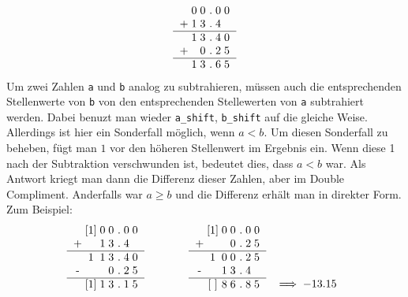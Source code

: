 \documentclass[course=erap]{aspdoc}
\begin{document}
\begin{equation}
\begin{tabular}{c@{\;}c@{\;}c@{\;}c@{\;}c}
  & 0 & 0 . & 0 & 0 \\
+ & 1 & 3 . & 4  \\
\hline
  & 1 & 3 . & 4 & 0 \\
+ &   & 0 . & 2 & 5 \\
\hline
  & 1 & 3 . & 6 & 5 \\
\end{tabular}
\end{equation}
Um zwei Zahlen \texttt{a} und \texttt{b} analog zu subtrahieren, müssen auch die entsprechenden Stellenwerte von \texttt{b} von den entsprechenden Stellewerten von \texttt{a} subtrahiert werden. Dabei benuzt man wieder \texttt{a\_shift}, \texttt{b\_shift} auf die gleiche Weise. Allerdings ist hier ein Sonderfall möglich, wenn $a < b$. Um diesen Sonderfall zu beheben, fügt man $1$ vor den höheren Stellenwert im Ergebnis ein. Wenn diese 1 nach der Subtraktion verschwunden ist, bedeutet dies, dass $a < b$ war. Als Antwort kriegt man dann die Differenz dieser Zahlen, aber im Double Compliment. Anderfalls war $a \geq b$ und die Differenz erhält man in direkter Form. Zum Beispiel:
\begin{equation}
\begin{tabular}{c@{\;}c@{\;}c@{\;}c@{\;}c@{\;}c}
  & [1] & 0 & 0 . & 0 & 0 \\
+ & & 1 & 3 . & 4  \\
\hline
  & 1 & 1 & 3 . & 4 & 0 \\
- & & & 0 . & 2 & 5 \\
\hline
  & [1] & 1 & 3 . & 1 & 5 \\ 
\end{tabular}
\\ \quad \quad \quad \quad
\begin{tabular}{c@{\;}c@{\;}c@{\;}c@{\;}c@{\;}c}
  & [1] & 0 & 0 . & 0 & 0 \\
+ & & & 0 . & 2 & 5 \\
\hline
  & 1 & 0 & 0 . & 2 & 5 \\
- & & 1 & 3 . & 4  \\
\hline
  & [ ] & 8 & 6 . & 8 & 5 \\ 
\end{tabular}
\\ 
\begin{tabular}{c@{\;}c}
  &  \\
  &  \\
  &  \\
  &  \\
  & $\implies -13.15$ \\
\end{tabular}
\end{equation}
\end{document}
